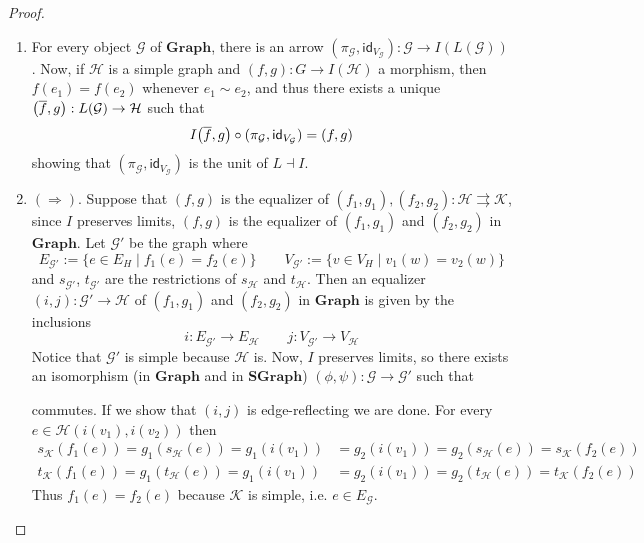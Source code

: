 \documentclass[runningheads,envcountsect]{lmcs}
\newcommand{\gr}{\catname{Graph}}
\newcommand{\dgr}{\catname{SGraph}}
\newcommand{\catname}[1]{\mathbf{#1}}
\newcommand{\id}[1]{\mathsf{id}_{#1}}
\theoremstyle{plain}
\theoremstyle{definition}
\begin{document}
\begin{proof} 
	\begin{enumerate}
		\item For every object $\mathcal{{G}}$ of $\gr$, there is an arrow $(\pi_\mathcal{{G}}, \id{V_\mathcal{{G}}}):\mathcal{{G}}\rightarrow I(L(\mathcal{{G}}))$. Now, if $\mathcal{{H}}$ is a simple graph and $(f,g):G\to I(\mathcal{{H}})$ a morphism, then $f(e_1)=f(e_2)$ whenever $e_1\sim e_2$, and thus there exists a unique $\qty(\overline{f}, g ):L(\mathcal{{G}})\to \mathcal{{H}}$ such that 
		\[I\qty (\overline{f}, g )\circ (\pi_\mathcal{{G}}, \id{V_\mathcal{{G}}}) =(f,g)\]
		showing that $(\pi_\mathcal{{G}}, \id{V_\mathcal{{G}}})$ is the unit of $L\dashv I$. 
		\item $(\Rightarrow)$. Suppose that $(f,g)$ is the equalizer of $(f_1, g_1), (f_2, g_2): \mathcal{{H}}\rightrightarrows \mathcal{{K}}$, since $I$ preserves limits, $(f,g)$ is the equalizer of $(f_1, g_1)$ and $(f_2, g_2)$ in $\gr$. Let $\mathcal{{G}}'$ be the graph where	
		\begin{equation*}
			E_{\mathcal{{G}}'}:=\{e\in E_H\mid f_1(e)=f_2(e)\}\qquad V_{\mathcal{{G}}'}:=\{v\in V_H\mid v_1(w)=v_2(w)\} 
		\end{equation*}
		and $s_{\mathcal{{G}}'}$, $t_{\mathcal{{G}}'}$ are the restrictions of $s_\mathcal{{H}}$ and $t_\mathcal{{H}}$. Then an equalizer  $(i,j):\mathcal{{G}}'\to \mathcal{{H}}$ of $(f_1, g_1)$ and $(f_2, g_2)$ in $\gr$ is given by the inclusions
		\[i:E_{\mathcal{{G}}'}\to E_\mathcal{{H}} \qquad j:V_{\mathcal{{G}}'}\to V_\mathcal{{H}}\]
		Notice that $\mathcal{{G}}'$ is simple because $\mathcal{{H}}$ is. Now, $I$ preserves limits, so there exists an isomorphism (in $\gr$ and in $\dgr$) $(\phi, \psi):\mathcal{{G}}\to \mathcal{{G}}'$ such that
			\begin{center}
		\end{center}	
		commutes. If we show that $(i,j)$ is edge-reflecting we are done. For every $e\in \mathcal{{H}}(i(v_1), i(v_2))$ then
		\begin{align*}
		s_\mathcal{{K}}(f_1(e))=g_1(s_\mathcal{{H}}(e))=g_1(i(v_1))&=g_2(i(v_1))=g_2(s_\mathcal{{H}}(e))=s_\mathcal{{K}}(f_2(e))\\
		t_\mathcal{{K}}(f_1(e))=g_1(t_\mathcal{{H}}(e))=g_1(i(v_1))&=g_2(i(v_1))=g_2(t_\mathcal{{H}}(e))=t_\mathcal{{K}}(f_2(e))
		\end{align*}
		Thus $f_1(e)=f_2(e)$ because $\mathcal{{K}}$ is simple, i.e. $e\in E_\mathcal{{G}}$.
		

\end{enumerate}
\end{proof}
\end{document}
